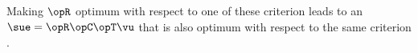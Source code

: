 Making $\opR$ optimum with respect to one of these criterion leads to
an  $\sue = \opR\opC\opT\vu$ that is also optimum
with respect to the same criterion .


